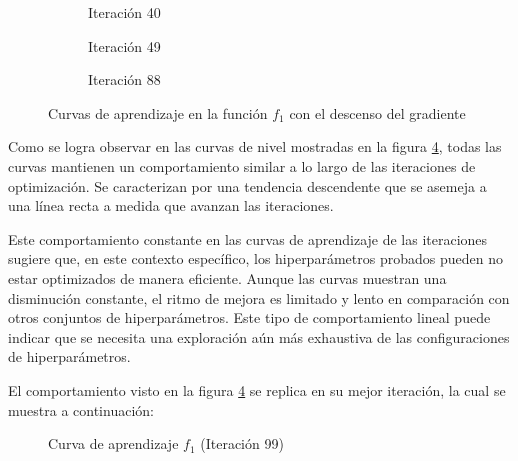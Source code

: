 \begin{figure}[h!]
     \centering
     \begin{subfigure}[b]{0.45\textwidth}
         \centering
         
         \caption{Iteración 40}
         \label{fig:learning-vanilla-f1-40}
     \end{subfigure}
     \hfill
     \begin{subfigure}[b]{0.45\textwidth}
         \centering
         
         \caption{Iteración 49}
         \label{fig:learning-vanilla-f1-49}
     \end{subfigure}
     \hfill
     \begin{subfigure}[b]{0.45\textwidth}
         \centering
         
         \caption{Iteración 88}
         \label{fig:learning-vanilla-f1-88}
     \end{subfigure}
        \caption{Curvas de aprendizaje en la función $f_1$ con el descenso del gradiente}
        \label{fig:learning-curves-f1}
\end{figure}

Como se logra observar en las curvas de nivel mostradas en la figura \ref{fig:learning-curves-f1}, todas las curvas mantienen un comportamiento similar a lo largo de las iteraciones de optimización. Se caracterizan por una tendencia descendente que se asemeja a una línea recta a medida que avanzan las iteraciones.

Este comportamiento constante en las curvas de aprendizaje de las iteraciones sugiere que, en este contexto específico, los hiperparámetros probados pueden no estar optimizados de manera eficiente. Aunque las curvas muestran una disminución constante, el ritmo de mejora es limitado y lento en comparación con otros conjuntos de hiperparámetros. Este tipo de comportamiento lineal puede indicar que se necesita una exploración aún más exhaustiva de las configuraciones de hiperparámetros.

El comportamiento visto en la figura \ref{fig:learning-curves-f1} se replica en su 
mejor iteración, la cual se muestra a continuación:

\begin{figure}[h!]
  \centering
    
  \caption{Curva de aprendizaje $f_1$ (Iteración 99)}
  \captionsetup{justification=centering}
  \label{fig:learning-vanilla-f1-99}
\end{figure}

